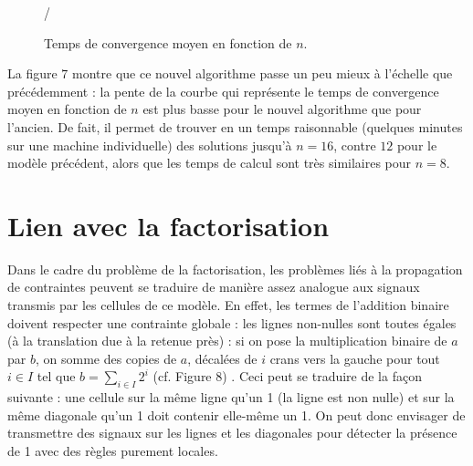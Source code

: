 \documentclass[11pt, openany]{article}
\begin{document}
\begin{figure}/
  \centering
  \caption{Temps de convergence moyen en fonction de $n$.}
\end{figure}  

La figure $7$ montre que ce nouvel algorithme passe un peu mieux à l'échelle que précédemment : la pente de la courbe qui représente le temps de convergence moyen en fonction de $n$ est plus basse pour le nouvel algorithme que pour l'ancien. De fait, il permet de trouver en un temps raisonnable (quelques minutes sur une machine individuelle) des solutions jusqu'à $n=16$, contre $12$ pour le modèle précédent, alors que les temps de calcul sont très similaires pour $n=8$.

\section*{Lien avec la factorisation}

Dans le cadre du problème de la factorisation, les problèmes liés à la propagation de contraintes peuvent se traduire de manière assez analogue aux signaux transmis par les cellules de ce modèle. En effet, les termes de l'addition binaire doivent respecter une contrainte globale : les lignes non-nulles sont toutes égales (à la translation due à la retenue près) : si on pose la multiplication binaire de $a$ par $b$, on somme des copies de $a$, décalées de $i$ crans vers la gauche pour tout $i\in I$ tel que $b = \sum_{i\in I}2^i$ (cf. Figure $8$) . Ceci peut se traduire de la façon suivante : une cellule sur la même ligne qu'un 1 (la ligne est non nulle) et sur la même diagonale qu'un 1 doit contenir elle-même un 1. On peut donc envisager de transmettre des signaux sur les lignes et les diagonales pour détecter la présence de 1 avec des règles purement locales. 
\end{document}
